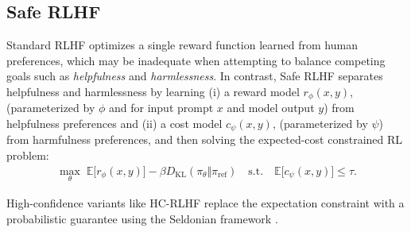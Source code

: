 
\subsection{Safe RLHF}
Standard RLHF optimizes a single reward function learned from human preferences, which may be inadequate when attempting to balance competing goals such as \emph{helpfulness} and \emph{harmlessness}. In contrast, Safe RLHF \citep{dai2023safe} separates helpfulness and harmlessness by learning (i) a reward model  $r_\phi(x,y)$, (parameterized by $\phi$ and for input prompt $x$ and model output $y$)  from helpfulness preferences and (ii) a cost model  $c_\psi(x,y)$, (parameterized by $\psi$)  from harmfulness preferences, and then solving the expected-cost constrained RL problem:
\begin{align}
  \max_\theta\;\mathbb{E}\big[r_\phi(x,y)\big] - \beta D_{\mathrm{KL}}(\pi_\theta\Vert \pi_{\mathrm{ref}}) \quad\text{s.t.}\quad \mathbb{E}\big[c_\psi(x,y)\big]\le \tau.
  \label{eq:safe-rlhf-obj}
\end{align}

High-confidence variants like HC-RLHF \citep{chittepu2025reinforcement} replace the expectation constraint with a probabilistic guarantee using the Seldonian framework \citep{thomas2019preventing}.




